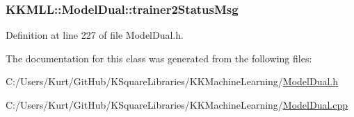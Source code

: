 \subsubsection[{\texorpdfstring{trainer2\+Status\+Msg}{trainer2StatusMsg}}]{ K\+K\+M\+L\+L\+::\+Model\+Dual\+::trainer2\+Status\+Msg\hspace{0.3cm}{\ttfamily [protected]}}\hypertarget{class_k_k_m_l_l_1_1_model_dual_a61010c9eeb9ff562ffc107527432bd1d}{}\label{class_k_k_m_l_l_1_1_model_dual_a61010c9eeb9ff562ffc107527432bd1d}


Definition at line 227 of file Model\+Dual.\+h.



The documentation for this class was generated from the following files\+:\begin{DoxyCompactItemize}
\item 
C\+:/\+Users/\+Kurt/\+Git\+Hub/\+K\+Square\+Libraries/\+K\+K\+Machine\+Learning/\hyperlink{_model_dual_8h}{Model\+Dual.\+h}\item 
C\+:/\+Users/\+Kurt/\+Git\+Hub/\+K\+Square\+Libraries/\+K\+K\+Machine\+Learning/\hyperlink{_model_dual_8cpp}{Model\+Dual.\+cpp}\end{DoxyCompactItemize}
